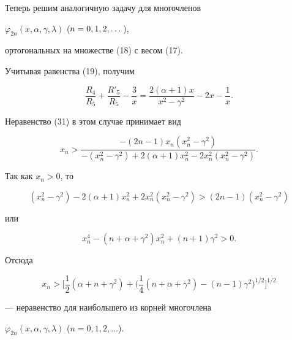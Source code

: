 \begin{exam} 


Теперь решим аналогичную задачу для многочленов 


$\varphi_{2n}(x,\alpha,\gamma,\lambda)$ ($n=\linebreak 0,1,2,\dotsc$), 


ортогональных на множестве (18) с весом (17). 


Учитывая равенства (19), получим 


$$ 


\frac{R_4}{R_5}+\frac{R'_5}{R_5}-\frac{3}{x}= 


\frac{2(\alpha+1)x}{x^2-\gamma^2}-2x-\frac{1}{x}. 


$$ 


Неравенство (31) в этом случае принимает вид 


$$ 


x_n>\frac{-(2n-1)x_n(x^2_n-\gamma^2)} 


{-(x^2_n-\gamma^2)+2(\alpha+1)x^2_n-2x^2_n(x^2_n-\gamma^2)}. 


$$ 


Так как $x_n>0$, то 


$$ 


(x^2_n-\gamma^2)-2(\alpha+1)x^2_n+2x^2_n(x^2_n-\gamma^2)> 


(2n-1)(x^2_n-\gamma^2) 


$$ 


или 


$$ 


x^4_n-(n+\alpha+\gamma^2)x^2_n+(n+1)\gamma^2>0. 


$$ 


Отсюда 


$$ 


x_n>\bigg[\frac{1}{2}(\alpha+n+\gamma^2)+\bigg(\frac{1}{4} 


(n+\alpha+\gamma^2)-(n-1)\gamma^2\bigg)^{1/2}\bigg]^{1/2} 


$$ 


--- неравенство для наибольшего из корней многочлена 


$\varphi_{2n}(x,\alpha,\gamma,\lambda)$ ($n=0,1,2,\dotsc$). 


\end{exam}


 


